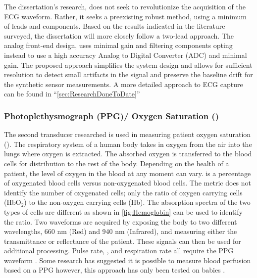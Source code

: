The dissertation's research, does not seek to revolutionize the acquisition of the ECG waveform. Rather, it seeks a preexisting robust method, using a minimum of leads and components. Based on the results indicated in the literature surveyed, the dissertation will more closely follow a two-lead approach. The analog front-end design, uses minimal gain and filtering components opting instead to use a high accuracy Analog to Digital Converter (ADC) and minimal gain. The proposed approach simplifies the system design and allows for sufficient resolution to detect small artifacts in the signal and preserve the baseline drift for the synthetic sensor measurements. A more detailed approach to ECG capture can be found in ``\cref{sec:ResearchDoneToDate}''



\subsubsection{Photoplethysmograph (PPG)/ Oxygen Saturation ()}

\label{subsubsec:Photoplethysmograph}
The second transducer researched is used in measuring patient oxygen saturation (). The respiratory system of a human body takes in oxygen from the air into the lungs where oxygen is extracted. The absorbed oxygen is transferred to the blood cells for distribution to the rest of the body. Depending on the health of a patient, the level of oxygen in the blood at any moment can vary.  is a percentage of oxygenated blood cells versus non-oxygenated blood cells. The  metric does not identify the number of oxygenated cells; only the ratio of oxygen carrying cells (HbO$_2$) to the non-oxygen carrying cells (Hb). The absorption spectra of the two types of cells are different as shown in \cref{fig:Hemoglobin}\cite{Prahl1998} can be used to identify the ratio. Two waveforms are acquired by exposing the body to two different wavelengths, 660 nm (Red) and 940 nm (Infrared), and measuring either the transmittance or reflectance of the patient. These signals can then be used for additional processing. Pulse rate, , and respiration rate all require the PPG waveform \cite{Scully2012,Kraitl2011}.  Some research has suggested it is possible to measure blood perfusion based on a PPG however, this approach has only been tested on babies \cite{Noor2011}.


